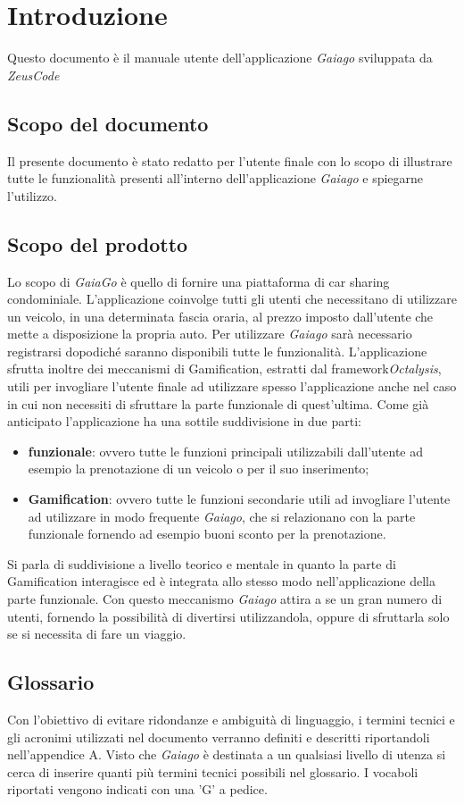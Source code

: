 \section{Introduzione}
Questo documento è il manuale utente dell'applicazione \textit{Gaiago} sviluppata da \textit{ZeusCode}
\subsection{Scopo del documento}
Il presente documento è stato redatto per l’utente finale con lo scopo di illustrare tutte le funzionalità presenti all'interno dell'applicazione \textit{Gaiago} e spiegarne l’utilizzo.

\subsection{Scopo del prodotto}
Lo scopo di \textit{GaiaGo} è quello di fornire una piattaforma di car sharing condominiale. L'applicazione coinvolge tutti gli utenti che necessitano di utilizzare un veicolo, in una determinata fascia oraria, al prezzo imposto dall'utente che mette a disposizione la propria auto. Per utilizzare \textit{Gaiago} sarà necessario registrarsi dopodiché saranno disponibili tutte le funzionalità. L'applicazione sfrutta inoltre dei meccanismi di Gamification\glosp, estratti dal framework\glosp \textit{Octalysis}\glosp, utili per invogliare l'utente finale ad utilizzare spesso l'applicazione anche nel caso in cui non necessiti di sfruttare la parte funzionale di quest'ultima. Come già anticipato l'applicazione ha una sottile suddivisione in due parti:
\begin{itemize}
	\item \textbf{funzionale}: ovvero tutte le funzioni principali utilizzabili dall'utente ad esempio la prenotazione di un veicolo o per il suo inserimento; 
	\item \textbf{Gamification}: ovvero tutte le funzioni secondarie utili ad invogliare l'utente ad utilizzare in modo frequente \textit{Gaiago}, che si relazionano con la parte funzionale fornendo ad esempio buoni sconto per la prenotazione.
\end{itemize}
 Si parla di suddivisione a livello teorico e mentale in quanto la parte di Gamification interagisce ed è integrata allo stesso modo nell'applicazione della parte funzionale.
 Con questo meccanismo \textit{Gaiago} attira a se un gran numero di utenti, fornendo la possibilità di divertirsi utilizzandola, oppure di sfruttarla solo se si necessita di fare un viaggio.
\subsection{Glossario}
Con l'obiettivo di evitare ridondanze e ambiguità di linguaggio, i termini tecnici e gli acronimi
utilizzati nel documento verranno definiti e descritti riportandoli nell'appendice A.
Visto che \textit{Gaiago} è destinata a un qualsiasi livello di utenza si cerca di inserire quanti più termini tecnici possibili nel glossario.
I vocaboli riportati vengono indicati con una 'G' a pedice.